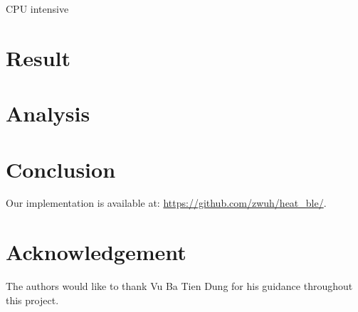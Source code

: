 \documentclass[conference,a4paper]{IEEEtran}
\begin{document}
CPU intensive


\section{Result}


\section{Analysis}


\section{Conclusion}
Our implementation is available at: \url{https://github.com/zwuh/heat_ble/}.


\section*{Acknowledgement}
The authors would like to thank Vu Ba Tien Dung for his guidance throughout this project.




\nocite*{}


\end{document}
